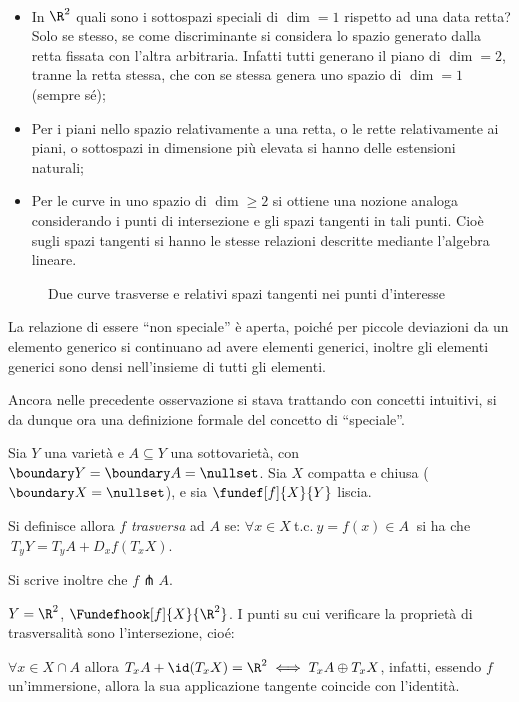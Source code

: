 \begin{es}~
\begin{itemize}
\item In $\R^2$ quali sono i sottospazi speciali di $\dim = 1$ rispetto ad una data retta? Solo se stesso, se come discriminante si considera lo spazio generato dalla retta fissata con l'altra arbitraria. Infatti tutti generano il piano di $\dim = 2$, tranne la retta stessa, che con se stessa genera uno spazio di $\dim = 1$ (sempre sé);
\item Per i piani nello spazio relativamente a una retta, o le rette relativamente ai piani, o sottospazi in dimensione più elevata si hanno delle estensioni naturali;
\item Per le curve in uno spazio di $\dim \geq 2$ si ottiene una nozione analoga considerando i punti di intersezione e gli spazi tangenti in tali punti. Cioè sugli spazi tangenti si hanno le stesse relazioni descritte mediante l'algebra lineare.
\end{itemize}

\begin{figure}[h]
\centering

\caption{Due curve trasverse e relativi spazi tangenti nei punti d'interesse}
\end{figure}
\end{es}

\begin{oss}
La relazione di essere ``non speciale'' è aperta, poiché per piccole deviazioni da un elemento generico si continuano ad avere elementi generici, inoltre gli elementi generici sono densi nell'insieme di tutti gli elementi.
\end{oss}

Ancora nelle precedente osservazione si stava trattando con concetti intuitivi, si da dunque ora una definizione formale del concetto di ``speciale''.

\begin{defn}[Trasversalità]
Sia $Y$ una varietà e $A\subseteq Y$ una sottovarietà, con $\boundary Y = \boundary A = \nullset$. Sia $X$ compatta e chiusa ($\boundary X = \nullset$), e sia $\fundef[f]{X}{Y}$ liscia.

Si definisce allora $f$ \emph{trasversa} ad $A$ se: $\forall x \in X~$t.c.$~y = f(x) \in A~$ si ha che $~T_yY = T_yA + D_xf(T_xX)$.

Si scrive inoltre che $f \pitchfork A$.
\end{defn}

\begin{es}
$Y = \R^2$, $\Fundefhook[f]{X}{\R^2}$. I punti su cui verificare la proprietà di trasversalità sono l'intersezione, cioé:

$\forall x \in X \cap A$ allora $T_xA + \id(T_xX) = \R^2 \iff T_xA \oplus T_xX$, infatti, essendo $f$ un'immersione, allora la sua applicazione tangente coincide con l'identità.
\end{es}

